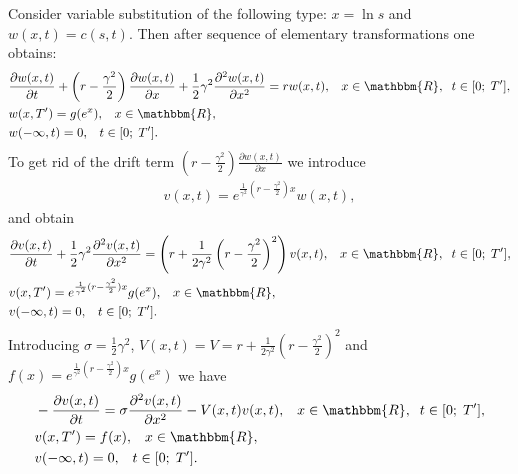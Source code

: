 \documentclass[11pt,a4paper]{extarticle}
\begin{document}
Consider variable substitution of the following type: $x=\ln s$ and $w(x,t) = c(s, t)$. Then after sequence of elementary transformations one obtains:
\begin{equation}
	\begin{aligned}
		&\frac{\partial w(x,t)}{\partial t} + \left(r-\frac{\gamma^2}{2}\right) \frac{\partial w(x,t)}{\partial x} + 
		\frac12 \gamma^2 \frac{\partial^2 w(x,t)}{\partial x^2} = rw(x,t),
		\;\;\;x \in \mathbbm{R},\;\; t \in [0;\;T^{\prime}],\\
		&w(x,T^{\prime}) = g(e^x), \;\;\; x \in \mathbbm{R},\\
		&w(-\infty,t) = 0, \;\;\; t \in [0;\;T^{\prime}].
	\end{aligned}
\end{equation}
To get rid of the drift term $\left(r-\frac{\gamma^2}{2}\right) \frac{\partial w(x,t)}{\partial x}$ we introduce
\begin{equation}
	\begin{aligned}
		v(x,t) = e^{\frac{1}{\gamma^2} (r-\frac{\gamma^2}{2})x} w(x,t),
	\end{aligned}
\end{equation}
and obtain
\begin{equation}
	\begin{aligned}
		&\frac{\partial v(x,t)}{\partial t} + \frac12 \gamma^2 \frac{\partial^2 v(x,t)}{\partial x^2} = 
		\left( r +  \frac{1}{2\gamma^2} \left( r-\frac{\gamma^2}{2}\right)^2 \right) v(x,t),
	 	\;\;\;x \in \mathbbm{R},\;\; t \in [0;\;T^{\prime}],\\
		&v(x,T^{\prime}) = e^{\frac{1}{\gamma^2} (r-\frac{\gamma^2}{2})x} g(e^x), \;\;\; x \in \mathbbm{R},\\
		&v(-\infty,t) = 0, \;\;\; t \in [0;\;T^{\prime}].
	\end{aligned}
\end{equation}
Introducing 
$\sigma = \frac12 \gamma^2$, $V(x,t) = V = r +  \frac{1}{2\gamma^2} \left( r-\frac{\gamma^2}{2}\right)^2$ and
$f(x) = e^{\frac{1}{\gamma^2} (r-\frac{\gamma^2}{2})x} g(e^x)$  we have
\begin{equation}
	\begin{aligned}
		&-\frac{\partial v(x,t)}{\partial t} = \sigma \frac{\partial^2 v(x,t)}{\partial x^2} - V(x,t) v(x,t),
		\;\;\;x \in \mathbbm{R},\;\; t \in [0;\;T^{\prime}],\\
		&v(x,T^{\prime}) = f(x), \;\;\; x \in \mathbbm{R},\\
		&v(-\infty,t) = 0, \;\;\; t \in [0;\;T^{\prime}].
	\end{aligned}
\end{equation}
\end{document}

